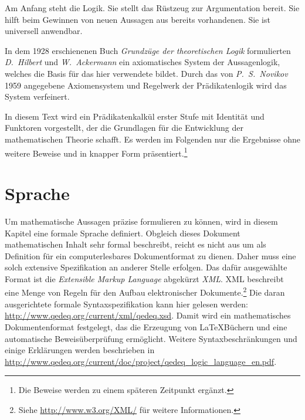 \documentclass[a4paper,german,10pt,twoside]{book}
\theoremstyle{definition}
\theoremstyle{remark}
\begin{document}
\par
Am Anfang steht die Logik. Sie stellt das R{\"u}stzeug zur Argumentation bereit. Sie hilft beim Gewinnen von neuen Aussagen aus bereits vorhandenen. Sie ist universell anwendbar. 

\par
In dem 1928 erschienenen Buch \emph{Grundz{\"u}ge der theoretischen Logik} formulierten \emph{D.~Hilbert} und \emph{W.~Ackermann} ein axiomatisches System der Aussagenlogik, welches die Basis f{\"u}r das hier verwendete bildet. Durch das von \emph{P.~S.~Novikov} 1959 angegebene Axiomensystem und Regelwerk der Pr{\"a}dikatenlogik wird das System verfeinert.

\par
In diesem Text wird ein Pr{\"a}dikatenkalk{\"u}l erster Stufe mit Identit{\"a}t und Funktoren vorgestellt, der die Grundlagen f{\"u}r die Entwicklung der mathematischen Theorie schafft. Es werden im Folgenden nur die Ergebnisse ohne weitere Beweise und in knapper Form pr{\"a}sentiert.\footnote{Die Beweise werden zu einem sp{\"a}teren Zeitpunkt erg{\"a}nzt.}


\chapter{Sprache} \label{chapter4} \hypertarget{chapter4}{}

Um mathematische Aussagen pr{\"a}zise formulieren zu k{\"o}nnen, wird in diesem Kapitel eine formale Sprache definiert. Obgleich dieses Dokument mathematischen Inhalt sehr formal beschreibt, reicht es nicht aus um als Definition f{\"u}r ein computerlesbares Dokumentformat zu dienen. Daher muss eine solch extensive Spezifikation an anderer Stelle erfolgen.
Das daf{\"u}r ausgew{\"a}hlte Format ist die \emph{Extensible Markup Language} abgek{\"u}rzt \emph{XML}. XML beschreibt eine Menge von Regeln f{\"u}r den Aufbau elektronischer Dokumente.\footnote{Siehe \url{http://www.w3.org/XML/} f{\"u}r weitere Informationen.} Die daran ausgerichtete formale Syntaxspezifikation kann hier gelesen werden: \url{http://www.qedeq.org/current/xml/qedeq.xsd}.
Damit wird ein mathematisches Dokumentenformat festgelegt, das die Erzeugung von \LaTeX B{\"u}chern und eine automatische Beweis{\"u}berpr{\"u}fung erm{\"o}glicht. 
Weitere Syntaxbeschr{\"a}nkungen und einige Erkl{\"a}rungen werden beschrieben in \url{http://www.qedeq.org/current/doc/project/qedeq_logic_language_en.pdf}.
\end{document}
